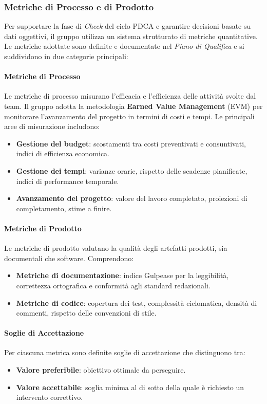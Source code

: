 \documentclass[a4paper, 11pt, oneside]{scrartcl} %
\begin{document}
\subsubsection{Metriche di Processo e di Prodotto}
Per supportare la fase di \textit{Check} del ciclo PDCA e garantire decisioni basate su dati oggettivi, il gruppo utilizza un sistema strutturato di metriche quantitative.
Le metriche adottate sono definite e documentate nel \emph{Piano di Qualifica}{\scriptsize{}} e si suddividono in due categorie principali:

\paragraph{Metriche di Processo}
Le metriche di processo misurano l'efficacia e l'efficienza delle attività svolte dal team.
Il gruppo adotta la metodologia \textbf{Earned Value Management}{\scriptsize{}} (EVM) per monitorare l'avanzamento del progetto in termini di costi e tempi.
Le principali aree di misurazione includono:
\begin{itemize}
    \item \textbf{Gestione del budget}: scostamenti tra costi preventivati e consuntivati, indici di efficienza economica.
    \item \textbf{Gestione dei tempi}: varianze orarie, rispetto delle scadenze pianificate, indici di performance temporale.
    \item \textbf{Avanzamento del progetto}: valore del lavoro completato, proiezioni di completamento, stime a finire.
\end{itemize}

\paragraph{Metriche di Prodotto}
Le metriche di prodotto valutano la qualità degli artefatti prodotti, sia documentali che software.
Comprendono:
\begin{itemize}
    \item \textbf{Metriche di documentazione}: indice Gulpease{\scriptsize{}} per la leggibilità, correttezza ortografica e conformità agli standard redazionali.
    \item \textbf{Metriche di codice}: copertura dei test, complessità ciclomatica, densità di commenti, rispetto delle convenzioni di stile.
\end{itemize}

\paragraph{Soglie di Accettazione}
Per ciascuna metrica sono definite soglie di accettazione che distinguono tra:
\begin{itemize}
    \item \textbf{Valore preferibile}: obiettivo ottimale da perseguire.
    \item \textbf{Valore accettabile}: soglia minima al di sotto della quale è richiesto un intervento correttivo.
\end{itemize}
\end{document}
